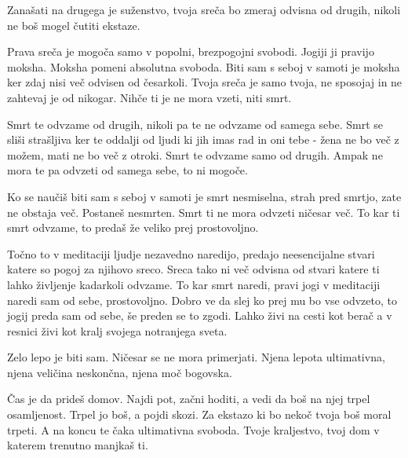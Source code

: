 Zanašati na drugega je suženstvo, tvoja sreča bo zmeraj odvisna od drugih, nikoli ne boš mogel čutiti ekstaze. 

Prava sreča je mogoča samo v popolni, brezpogojni svobodi. Jogiji ji pravijo moksha. Moksha pomeni absolutna svoboda. Biti sam s seboj v samoti je moksha ker zdaj nisi več odvisen od česarkoli. Tvoja sreča je samo tvoja, ne sposojaj in ne zahtevaj je od nikogar. Nihče ti je ne mora vzeti, niti smrt. 

Smrt te odvzame od drugih, nikoli pa te ne odvzame od samega sebe. Smrt se sliši strašljiva ker te oddalji od ljudi ki jih imas rad in oni tebe - žena ne bo več z možem, mati ne bo več z otroki. Smrt te odvzame samo od drugih. Ampak ne mora te pa odvzeti od samega sebe, to ni mogoče. 

Ko se naučiš biti sam s seboj v samoti je smrt nesmiselna, strah pred smrtjo, zate ne obstaja več. Postaneš nesmrten. Smrt ti ne mora odvzeti ničesar več. To kar ti smrt odvzame, to predaš že veliko prej prostovoljno. 

Točno to v meditaciji ljudje nezavedno naredijo, predajo neesencijalne stvari katere so pogoj za njihovo sreco. Sreca tako ni več odvisna od stvari katere ti lahko življenje kadarkoli odvzame. To kar smrt naredi, pravi jogi v meditaciji naredi sam od sebe, prostovoljno. Dobro ve da slej ko prej mu bo vse odvzeto, to jogij preda sam od sebe, še preden se to zgodi. Lahko živi na cesti kot berač a v resnici živi kot kralj svojega notranjega sveta. 

Zelo lepo je biti sam. Ničesar se ne mora primerjati. Njena lepota ultimativna, njena veličina neskončna, njena moč bogovska. 

Čas je da prideš domov. Najdi pot, začni hoditi, a vedi da boš na njej trpel osamljenost. Trpel jo boš, a pojdi skozi. Za ekstazo ki bo nekoč tvoja boš moral trpeti. A na koncu te čaka ultimativna svoboda. Tvoje kraljestvo, tvoj dom v katerem trenutno manjkaš ti. 